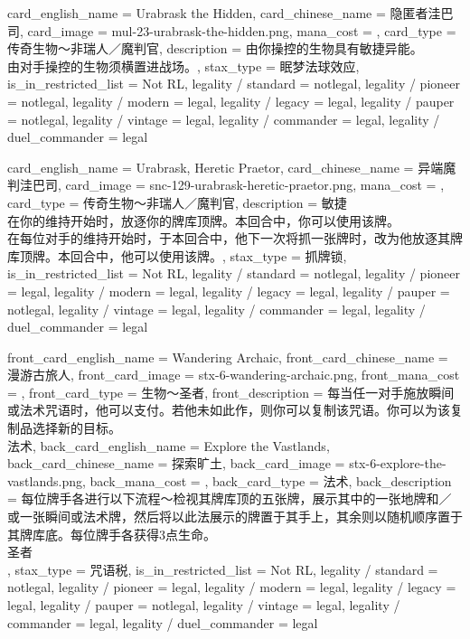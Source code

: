 \documentclass[lang = cn, color = black, 10pt]{AllThatStax}
\begin{document}
\card
{
	card_english_name = {Urabrask the Hidden},
	card_chinese_name = {隐匿者洼巴司},
	card_image = mul-23-urabrask-the-hidden.png,
	mana_cost = ,
	card_type = 传奇生物～非瑞人／魔判官,
	description = {由你操控的生物具有敏捷异能。\\
由对手操控的生物须横置进战场。},
	stax_type = 眠梦法球效应,
	is_in_restricted_list = Not RL,
	legality / standard = notlegal,
	legality / pioneer = notlegal,
	legality / modern = legal,
	legality / legacy = legal,
	legality / pauper = notlegal,
	legality / vintage = legal,
	legality / commander = legal,
	legality / duel_commander = legal
}

\card
{
	card_english_name = {Urabrask, Heretic Praetor},
	card_chinese_name = {异端魔判洼巴司},
	card_image = snc-129-urabrask-heretic-praetor.png,
	mana_cost = ,
	card_type = 传奇生物～非瑞人／魔判官,
	description = {敏捷\\
在你的维持开始时，放逐你的牌库顶牌。本回合中，你可以使用该牌。\\
在每位对手的维持开始时，于本回合中，他下一次将抓一张牌时，改为他放逐其牌库顶牌。本回合中，他可以使用该牌。},
	stax_type = 抓牌锁,
	is_in_restricted_list = Not RL,
	legality / standard = notlegal,
	legality / pioneer = legal,
	legality / modern = legal,
	legality / legacy = legal,
	legality / pauper = notlegal,
	legality / vintage = legal,
	legality / commander = legal,
	legality / duel_commander = legal
}

\mfcard
{
	front_card_english_name = {Wandering Archaic},
	front_card_chinese_name = {漫游古旅人},
	front_card_image = stx-6-wandering-archaic.png,
	front_mana_cost = ,
	front_card_type = 生物～圣者,
	front_description = {每当任一对手施放瞬间或法术咒语时，他可以支付。若他未如此作，则你可以复制该咒语。你可以为该复制品选择新的目标。\\
法术},
	back_card_english_name = {Explore the Vastlands},
	back_card_chinese_name = {探索旷土},
	back_card_image = stx-6-explore-the-vastlands.png,
	back_mana_cost = ,
	back_card_type = 法术,
	back_description = {每位牌手各进行以下流程～检视其牌库顶的五张牌，展示其中的一张地牌和／或一张瞬间或法术牌，然后将以此法展示的牌置于其手上，其余则以随机顺序置于其牌库底。每位牌手各获得3点生命。\\
圣者\\
},
	stax_type = 咒语税,
	is_in_restricted_list = Not RL,
	legality / standard = notlegal,
	legality / pioneer = legal,
	legality / modern = legal,
	legality / legacy = legal,
	legality / pauper = notlegal,
	legality / vintage = legal,
	legality / commander = legal,
	legality / duel_commander = legal
}
\end{document}
